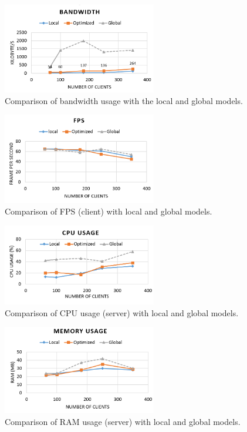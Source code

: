 \documentclass[]{elsarticle}
\begin{document}
\begin{figure}[t]
\centering
\includegraphics[width=0.6\textwidth]{acm-vrst13-img/reload_bandwidth_mod.png}
\caption{Comparison of bandwidth usage with the local and global models.}
\label{fig:bandwidth}
\end{figure}

\begin{figure}[t]
\centering
\includegraphics[width=0.6\textwidth]{acm-vrst13-img/reload_fps_mod.png}
\caption{Comparison of FPS (client) with local and global models.}
\label{fig:fps}
\end{figure}

\begin{figure}[t]
\centering
\includegraphics[width=0.6\textwidth]{acm-vrst13-img/reload_cpu_mod.png}
\caption{Comparison of CPU usage (server) with local and global models.}
\label{fig:cpu}
\end{figure}

\begin{figure}[t]
\centering
\includegraphics[width=0.6\textwidth]{acm-vrst13-img/reload_memory_mod.png}
\caption{Comparison of RAM usage (server) with local and global models.}
\label{fig:ram}
\end{figure}
\end{document}

